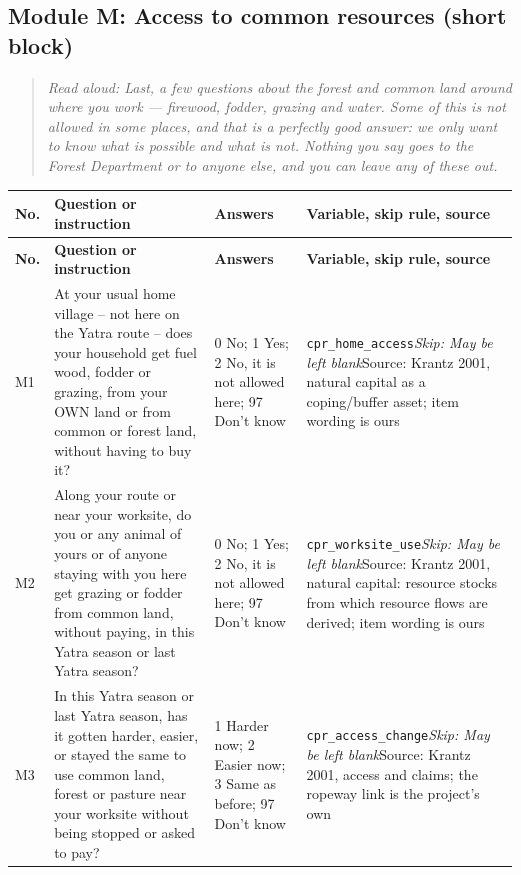 \documentclass[10pt]{article}
\begin{document}
\subsection*{Module M: Access to common resources (short block)}
\begin{quote}\small\textit{Read aloud: Last, a few questions about the forest and common land around where you work — firewood, fodder, grazing and water. Some of this is not allowed in some places, and that is a perfectly good answer: we only want to know what is possible and what is not. Nothing you say goes to the Forest Department or to anyone else, and you can leave any of these out.}\end{quote}
{\scriptsize
\begin{longtable}{p{0.8cm}p{6.4cm}p{3.6cm}p{5.8cm}}
\toprule
\textbf{No.} & \textbf{Question or instruction} & \textbf{Answers} & \textbf{Variable, skip rule, source} \\
\midrule
\endfirsthead
\toprule
\textbf{No.} & \textbf{Question or instruction} & \textbf{Answers} & \textbf{Variable, skip rule, source} \\
\midrule
\endhead
M1 & At your usual home village -- not here on the Yatra route -- does your household get fuel wood, fodder or grazing, from your OWN land or from common or forest land, without having to buy it? & 0 No; 1 Yes; 2 No, it is not allowed here; 97 Don't know & \texttt{cpr\_home\_access}\newline \textit{Skip: May be left blank}\newline Source: Krantz 2001, natural capital as a coping/buffer asset; item wording is ours \\
M2 & Along your route or near your worksite, do you or any animal of yours or of anyone staying with you here get grazing or fodder from common land, without paying, in this Yatra season or last Yatra season? & 0 No; 1 Yes; 2 No, it is not allowed here; 97 Don't know & \texttt{cpr\_worksite\_use}\newline \textit{Skip: May be left blank}\newline Source: Krantz 2001, natural capital: resource stocks from which resource flows are derived; item wording is ours \\
M3 & In this Yatra season or last Yatra season, has it gotten harder, easier, or stayed the same to use common land, forest or pasture near your worksite without being stopped or asked to pay? & 1 Harder now; 2 Easier now; 3 Same as before; 97 Don't know & \texttt{cpr\_access\_change}\newline \textit{Skip: May be left blank}\newline Source: Krantz 2001, access and claims; the ropeway link is the project's own \\
\bottomrule
\end{longtable}
}
\end{document}
